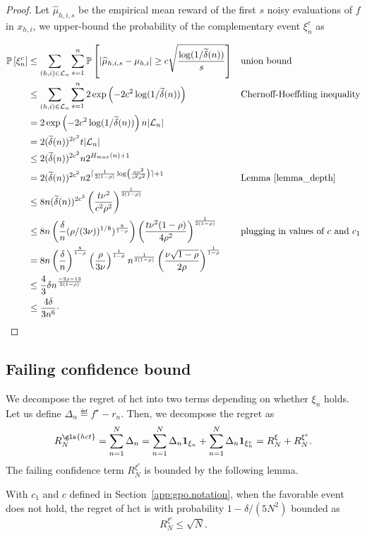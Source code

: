 \begin{proof}
Let $\hat{\mu}_{h,i,s}$ be the empirical mean reward of the first $s$ noisy evaluations of $f$ in $x_{h,i}$, we upper-bound the probability of the complementary event $\xi_n^c$ as

\begin{align*}
    \mathbb{P}\left[ \xi_n^c \right]
    & \leq \sum_{(h,i)\in\mathcal{L}_n}\sum_{s=1}^{n} \mathbb{P}\left[ |\widehat{\mu}_{h,i,s} - \mu_{h,i}| \geq c\sqrt{\frac{\log(1/\widetilde{\delta}(n))}{s}} \right] && \text{union bound} \\
    & \leq \sum_{(h,i)\in\mathcal{L}_n}\sum_{s=1}^{n} 2\operatorname{exp}\left( -2c^2\log(1/\widetilde{\delta}(n)) \right) && \text{Chernoff-Hoeffding inequality} \\
    & = 2\operatorname{exp}\left( -2c^2\log(1/\widetilde{\delta}(n)) \right) n|\mathcal{L}_n| \\
    & = 2(\widetilde{\delta}(n))^{2c^2}t|\mathcal{L}_n| \\
    & \leq 2(\widetilde{\delta}(n))^{2c^2}n 2^{H_{max}(n)+1} \\
    & = 2(\widetilde{\delta}(n))^{2c^2}n 2^{\lceil\frac{1}{2(1-\rho)}\log\left(\frac{n\nu^2}{c^2\rho^2} \right)\rceil+1} && \text{Lemma~\ref{lemma_depth}} \\
    & \leq 8n(\widetilde{\delta}(n))^{2c^2} \left( \frac{t\nu^2}{c^2\rho^2} \right)^{\frac{1}{2(1-\rho)}} \\
    & \leq 8n\left(\frac{\delta}{n} (\rho/(3\nu))^{1/8})^{\frac{8}{1-\rho}}\right) \left( \frac{t\nu^2(1-\rho)}{4\rho^2}\right)^{\frac{1}{2(1-\rho)}} && \text{plugging in values of $c$ and $c_1$} \\
    & = 8n\left(\frac{\delta}{n}\right)^{\frac{8}{1-\rho}} \left(\frac{\rho}{3\nu}\right)^{\frac{1}{1-\rho}} n^{\frac{1}{2(1-\rho)}} \left( \frac{\nu\sqrt{1-\rho}}{2\rho}\right)^{\frac{1}{1-\rho}} \\
    & \leq \frac{4}{3} \delta n^{\frac{-2\rho-13}{2(1-\rho)}} \\
    & \leq \frac{4\delta}{3n^6}\cdot
\end{align*}

\end{proof}

\subsection{Failing confidence bound}\label{proof:lemma_failing}

We decompose the regret of \gls{hct} into two terms depending on whether $\xi_n$ holds. Let us define $\Delta_n \eqdef f^\star - r_n$. Then, we decompose the regret as
\[
R_N^{\gls{hct}} = \sum_{n=1}^N \Delta_n = \sum_{n=1}^N \Delta_n \bOne_{\xi_n} + \sum_{n=1}^N \Delta_n \bOne_{\xi_n^c} = R_N^{\xi} + R_N^{\xi^c}.
\]
The failing confidence term $R_N^{\xi^c}$ is bounded by the following lemma.
\begin{lemma} \label{lemma_failing}
With $c_1$ and $c$ defined in Section~\ref{app:gpo.notation}, when the favorable event does not hold, the regret of {\gls{hct}} is with probability $1-\delta/(5N^2)$ bounded as
\[
R_N^{\xi^c} \leq \sqrt{N}.
\]
\end{lemma}

